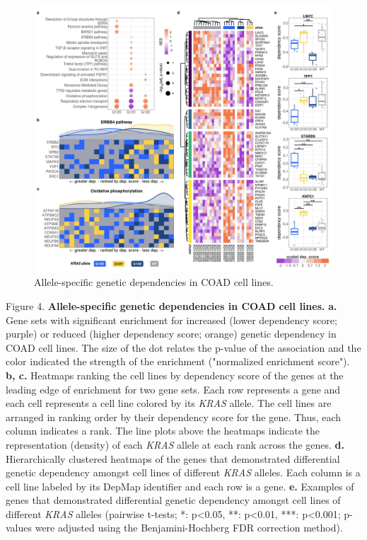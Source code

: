 \documentclass[english, 10pt, letterpaper]{article}
\newcommand{\KRAS}{\emph{KRAS}}
\begin{document}
\begin{figure}[h!]
\centering
\includegraphics[width=176mm]{figures/Fig_4.jpeg}
\caption{Allele-specific genetic dependencies in COAD cell lines.}
\label{fig:coad-dependency-main}
\end{figure}
\newpage
\newpage
\noindent Figure 4. \textbf{Allele-specific genetic dependencies in COAD cell lines.}
\textbf{a.} Gene sets with significant enrichment for increased (lower dependency score; purple) or reduced (higher dependency score; orange) genetic dependency in COAD cell lines. The size of the dot relates the p-value of the association and the color indicated the strength of the enrichment ("normalized enrichment score").
\textbf{b, c.} Heatmaps ranking the cell lines by dependency score of the genes at the leading edge of enrichment for two gene sets. Each row represents a gene and each cell represents a cell line colored by its \KRAS{} allele. The cell lines are arranged in ranking order by their dependency score for the gene. Thus, each column indicates a rank. The line plots above the heatmaps indicate the representation (density) of each \KRAS{} allele at each rank across the genes.
\textbf{d.} Hierarchically clustered heatmaps of the genes that demonstrated differential genetic dependency amongst cell lines of different \KRAS{} alleles. Each column is a cell line labeled by its DepMap identifier and each row is a gene.
\textbf{e.} Examples of genes that demonstrated differential genetic dependency amongst cell lines of different \KRAS{} alleles (pairwise t-tests; *: p<0.05, **: p<0.01, ***: p<0.001; p-values were adjusted using the Benjamini-Hochberg FDR correction method).
\newpage
\end{document}
